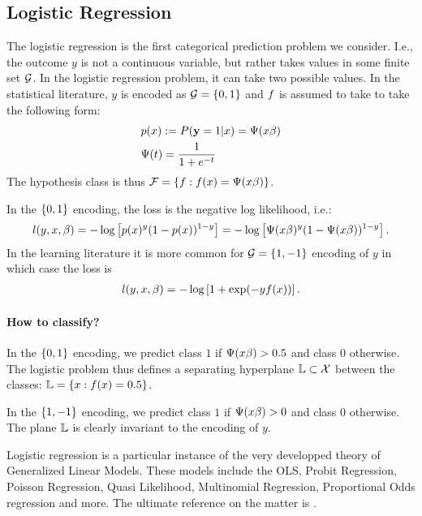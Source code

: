 \subsection{Logistic Regression}
\label{sec:logistic}
The logistic regression is the first categorical prediction problem we consider. 
I.e., the outcome $y$ is not a continuous variable, but rather takes values in some finite set $\mathcal{G}$. In the logistic regression problem, it can take two possible values.
In the statistical literature, $y$ is encoded as $\mathcal{G}=\left\{ 0,1 \right\}$ and $f$ is assumed to take to take the following form:
\begin{align}
	& p(x):= P(\mathbf{y}=1|x) = \Psi(x\beta) \\
	& \Psi(t) = \frac{1}{1+e^{-t}}
\end{align}
The hypothesis class is thus  $\mathcal{F}=\left\{ f:f(x)=\Psi(x\beta) \right\} $.

In the $\left\{ 0,1 \right\}$ encoding, the loss is the negative log likelihood, i.e.:
\begin{align}
	l(y,x,\beta) = 
	-\log \left[ p(x)^{y} (1-p(x))^{1-y}  \right] =
	-\log \left[ \Psi(x\beta)^{y} (1-\Psi(x\beta))^{1-y}  \right].
\end{align}
In the learning literature it is more common for $\mathcal{G}=\left\{ 1,-1 \right\}$ encoding of $y$ in which case the loss is 
\begin{align}
	l(y,x,\beta) = -\log \left[ 1+\exp(-y f(x))  \right].
\end{align}


\paragraph{How to classify?}
In the $\left\{ 0,1 \right\}$ encoding, we predict class $1$ if $\Psi(x\beta)>0.5$ and class $0$ otherwise.
The logistic problem thus defines a separating hyperplane $\mathbb{L} \subset \mathcal{X}$ between the classes: $\mathbb{L}=\left\{ x:f(x)=0.5 \right\}$.

In the $\left\{ 1,-1 \right\}$ encoding, we predict class $1$ if $\Psi(x\beta)>0$ and class $0$ otherwise.
The plane $\mathbb{L}$ is clearly invariant to the encoding of $y$.




\begin{remark}
Logistic regression is a particular instance of the very developped theory of Generalized Linear Models.
These models include the OLS, Probit Regression, Poisson Regression, Quasi Likelihood, Multinomial Regression, Proportional Odds regression and more.
The ultimate reference on the matter is \cite{mccullagh_generalized_1989}.
\end{remark}




